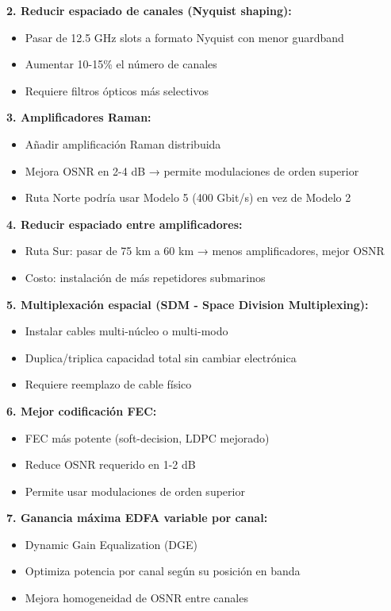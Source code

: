 \documentclass[12pt,a4paper]{extarticle}
\begin{document}
\textbf{2. Reducir espaciado de canales (Nyquist shaping):}
\begin{itemize}
    \item Pasar de 12.5 GHz slots a formato Nyquist con menor guardband
    \item Aumentar 10-15\% el número de canales
    \item Requiere filtros ópticos más selectivos
\end{itemize}

\textbf{3. Amplificadores Raman:}
\begin{itemize}
    \item Añadir amplificación Raman distribuida
    \item Mejora OSNR en 2-4 dB → permite modulaciones de orden superior
    \item Ruta Norte podría usar Modelo 5 (400 Gbit/s) en vez de Modelo 2
\end{itemize}

\textbf{4. Reducir espaciado entre amplificadores:}
\begin{itemize}
    \item Ruta Sur: pasar de 75 km a 60 km → menos amplificadores, mejor OSNR
    \item Costo: instalación de más repetidores submarinos
\end{itemize}

\textbf{5. Multiplexación espacial (SDM - Space Division Multiplexing):}
\begin{itemize}
    \item Instalar cables multi-núcleo o multi-modo
    \item Duplica/triplica capacidad total sin cambiar electrónica
    \item Requiere reemplazo de cable físico
\end{itemize}

\textbf{6. Mejor codificación FEC:}
\begin{itemize}
    \item FEC más potente (soft-decision, LDPC mejorado)
    \item Reduce OSNR requerido en 1-2 dB
    \item Permite usar modulaciones de orden superior
\end{itemize}

\textbf{7. Ganancia máxima EDFA variable por canal:}
\begin{itemize}
    \item Dynamic Gain Equalization (DGE)
    \item Optimiza potencia por canal según su posición en banda
    \item Mejora homogeneidad de OSNR entre canales
\end{itemize}
\end{document}
